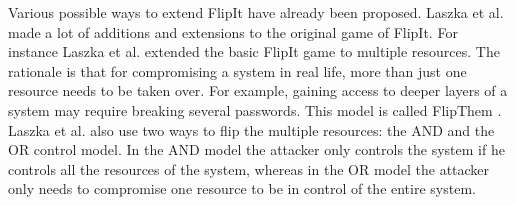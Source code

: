 Various possible ways to extend FlipIt have already been proposed. 
Laszka et al. made a lot of additions and extensions to the original game of FlipIt. For instance Laszka et al. extended the basic FlipIt game to multiple resources. The rationale is that for compromising a system in real life, more than just one resource needs to be taken over. For example, gaining access to deeper layers of a system may require breaking several passwords. This model is called FlipThem \cite{FlipThem}. Laszka et al. also use two ways to flip the multiple resources: the AND and the OR control model. In the AND model the attacker only controls the system if he controls all the resources of the system, whereas in the OR model the attacker only needs to compromise one resource to be in control of the entire system. \\

